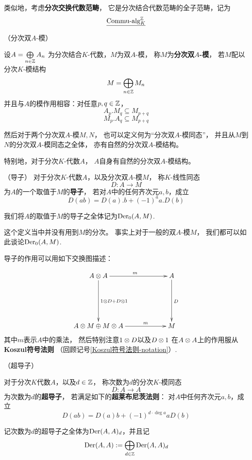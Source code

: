 类似地，考虑\textbf{分次交换代数范畴}，
它是分次结合代数范畴的全子范畴，记为
$$\underline{\operatorname{Commu}\!\text{-}\!\operatorname{alg}^{\mathbb{Z}}_{K}}$$

\begin{definition}（分次双$A$-模）

设$A=\bigoplus\limits_{n\in\mathbb{Z}}A_n$
为分次结合$K$-代数，$M$为双$A$-模，
称$M$为\textbf{分次双$A$-模}，
若$M$配以分次$K$-模结构
$$M=\bigoplus_{n\in\mathbb{Z}}M_n$$
并且与$A$的模作用相容：对任意$p,q\in\mathbb{Z}$，
$$A_p.M_q\subseteq M_{p+q}$$
$$M_p.A_q\subseteq M_{p+q}$$
\end{definition}

然后对于两个分次双$A$-模$M,N$，
也可以定义何为“分次双$A$-模同态”，
并且从$M$到$N$的分次双$A$-模同态之全体，
亦有自然的分次双$A$-模结构。

特别地，对于分次$K$-代数$A$，
$A$自身有自然的分次双$A$-模结构。


\begin{definition}（导子）
对于分次$K$-代数$A$，以及分次双$A$-模$M$，
称$K$-线性同态
$$D:A\to M$$
为$A$的一个取值于$M$的\textbf{导子}，
若对$A$中的任何齐次元$a,b$，成立
$$D(ab)=D(a).b+(-1)^a a.D(b)$$

我们将$A$的取值于$M$的导子之全体记为$\operatorname{Der}_0(A,M)$.
\end{definition}
这个定义当中并没有用到$M$的分次。
事实上对于一般的双$A$-模$M$，
我们都可以如此谈论$\operatorname{Der}_0(A,M)$.

导子的作用可以用如下交换图描述：

$$
  \xymatrixcolsep{5pc}
  \xymatrixrowsep{5pc}
  \xymatrix{
      A\ten A   \ar[r]^m    \ar[d]^{1\ten D+ D\ten 1}
    & A                     \ar[d]^D
  \\
      A\ten M\oplus M\ten A \ar[r]^-m
    & M
  }
$$
其中$m$表示$A$中的乘法，
然后特别注意$1\otimes D$以及$D\otimes 1$
在$A\otimes A$上的作用服从\textbf{Koszul符号法则}
（回顾记号\ref{Koszul符号法则-notation}）.



\begin{definition}（超导子）

对于分次$K$代数$A$，以及$d\in\mathbb{Z}$，
称次数为$d$的分次$K$-模同态
$$D:A\to A$$
为次数为$d$的\textbf{超导子}，
若满足如下的\textbf{超莱布尼茨法则}：
对$A$中任何齐次元$a,b$，成立
$$D(ab)=D(a)b+(-1)^{d\cdot\deg a}aD(b)$$

记次数为$d$的超导子之全体为$\operatorname{Der}(A,A)_d$，并且记
$$\operatorname{Der}(A,A):=\bigoplus_{d\in\mathbb{Z}}\operatorname{Der}(A,A)_d$$
\end{definition}

